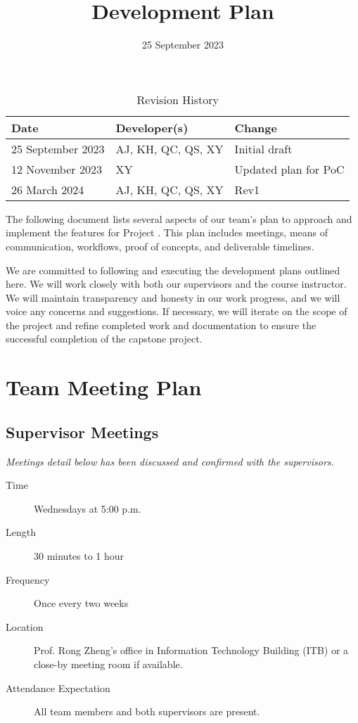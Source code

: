 \documentclass{article}
\title{Development Plan\\\progname}
\author{\authname}
\date{25 September 2023}
\begin{document}
\maketitle

\begin{table}[hp]
  \caption{Revision History} \label{TblRevisionHistory}
  \begin{tabularx}{\textwidth}{llX}
    \toprule
    \textbf{Date} & \textbf{Developer(s)} & \textbf{Change} \\
    \midrule
    25 September 2023 & AJ, KH, QC, QS, XY & Initial draft \\
    12 November 2023 & XY & Updated plan for PoC \\
    26 March 2024 & AJ, KH, QC, QS, XY & Rev1 \\
    \bottomrule
  \end{tabularx}
\end{table}

The following document lists several aspects of our team's plan to approach and
implement the features for Project \projname. This plan includes meetings, means
of communication, workflows, proof of concepts, and deliverable timelines.

We are committed to following and executing the development plans outlined here.
We will work closely with both our supervisors and the course instructor. We
will maintain transparency and honesty in our work progress, and we will voice
any concerns and suggestions. If necessary, we will iterate on the scope of the
project and refine completed work and documentation to ensure the successful
completion of the capstone project.

\section{Team Meeting Plan}

\subsection{Supervisor Meetings}

\emph{Meetings detail below has been discussed and confirmed with the supervisors.}

\begin{description}
\item[Time] Wednesdays at 5:00 p.m.
\item[Length] 30 minutes to 1 hour
\item[Frequency] Once every two weeks
\item[Location] Prof. Rong Zheng's office in Information Technology Building (ITB)
  or a close-by meeting room if available.
\item[Attendance Expectation] All team members and both supervisors are present.
\end{description}
\end{document}
